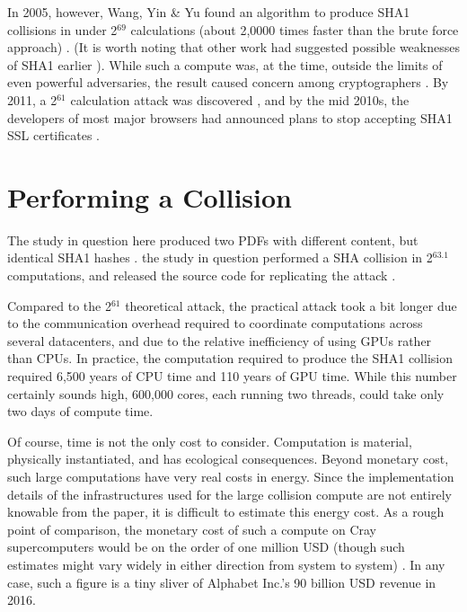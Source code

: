 \documentclass[sigconf]{acmart}
\begin{document}
In 2005, however, Wang, Yin \& Yu found an algorithm to produce SHA1 collisions in under 2\(^{\text{69}}\) calculations (about 2,0000 times faster than the brute force approach)
\cite{Wang2005}.
(It is worth noting that other work had suggested possible weaknesses of SHA1 earlier \cite{Biham2005}).
While such a compute was, at the time, outside the limits of even powerful adversaries,
the result caused concern among cryptographers \cite{Schneier2005}.
By 2011, a 2\(^{\text{61}}\) calculation attack was discovered \cite{Stevens2013a},
and by the mid 2010s, the developers of most major browsers had announced plans to stop accepting SHA1 SSL certificates 
\cite{Mozilla2017,Sleevi2014}.


\section{Performing a Collision}
\label{sec:orga1f3d0c}

The study in question here produced two PDFs with different content, but identical SHA1 hashes
\cite{Stevens2017}.
the study in question performed a SHA collision in 2\(^{\text{63.1}}\) computations, 
and released the source code for replicating the attack
\cite{Stevens2017github}.

Compared to the 2\(^{\text{61}}\) theoretical attack, the practical attack took a bit longer due to the communication overhead required to coordinate computations across several datacenters, and due to the relative inefficiency of using GPUs rather than CPUs.
In practice, the computation required to produce the SHA1 collision required 6,500 years of CPU time and 110 years of GPU time. While this number certainly sounds high, 600,000 cores, each running two threads, could take only two days of compute time.

Of course, time is not the only cost to consider.
Computation is material, physically instantiated, and has ecological consequences.
Beyond monetary cost, such large computations have very real costs in energy.
Since the implementation details of the infrastructures used for the large collision compute are not entirely knowable from the paper,
it is difficult to estimate this energy cost.
As a rough point of comparison, the monetary cost of such a compute on Cray supercomputers would be on the order of one million USD 
(though such estimates might vary widely in either direction from system to system)
\cite{Pautsch2016}.
In any case, such a figure is a tiny sliver of Alphabet Inc.'s 90 billion USD revenue in 2016.
\end{document}
